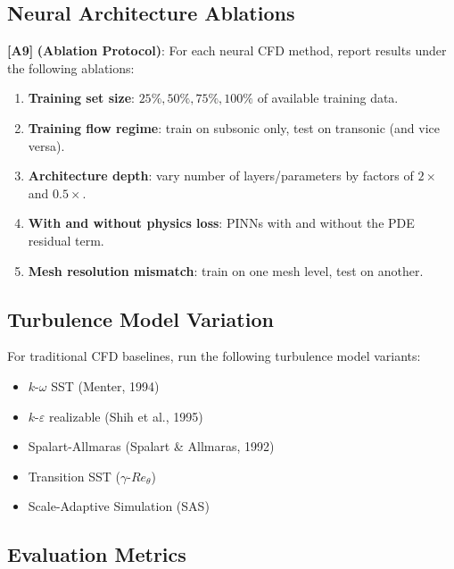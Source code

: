 \documentclass[11pt,a4paper]{article}
\theoremstyle{definition}
\theoremstyle{remark}
\newcommand{\assumptionTag}[1]{\textsf{\textbf{[A#1]}}}
\begin{document}
\subsection{Neural Architecture Ablations}

\assumptionTag{9} \textbf{(Ablation Protocol)}: For each neural CFD method, report results under the following ablations:
\begin{enumerate}[label=(\roman*)]
    \item \textbf{Training set size}: $25\%, 50\%, 75\%, 100\%$ of available training data.
    \item \textbf{Training flow regime}: train on subsonic only, test on transonic (and vice versa).
    \item \textbf{Architecture depth}: vary number of layers/parameters by factors of $2\times$ and $0.5\times$.
    \item \textbf{With and without physics loss}: PINNs with and without the PDE residual term.
    \item \textbf{Mesh resolution mismatch}: train on one mesh level, test on another.
\end{enumerate}

\subsection{Turbulence Model Variation}

For traditional CFD baselines, run the following turbulence model variants:
\begin{itemize}[nosep]
    \item $k$-$\omega$ SST (Menter, 1994)
    \item $k$-$\varepsilon$ realizable (Shih et al., 1995)
    \item Spalart-Allmaras (Spalart \& Allmaras, 1992)
    \item Transition SST ($\gamma$-$Re_\theta$)
    \item Scale-Adaptive Simulation (SAS)
\end{itemize}

\subsection{Evaluation Metrics}
\end{document}
